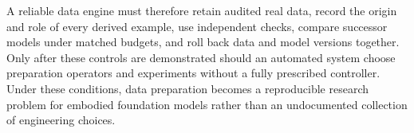 A reliable data engine must therefore retain audited real data, record the origin and role of every derived example, use independent checks, compare successor models under matched budgets, and roll back data and model versions together.
Only after these controls are demonstrated should an automated system choose preparation operators and experiments without a fully prescribed controller.
Under these conditions, data preparation becomes a reproducible research problem for embodied foundation models rather than an undocumented collection of engineering choices.
